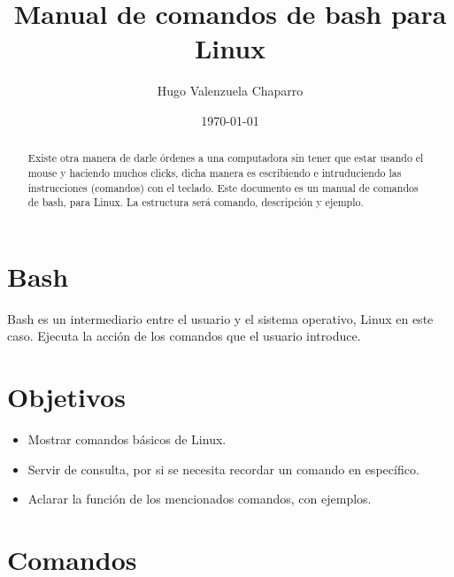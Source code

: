 \documentclass[notitlepage,12pt]{article}
\title{Manual de comandos de bash para Linux}
\author{Hugo Valenzuela Chaparro}
\date{\today}
\begin{document}
\begin{abstract}
\color{blue} Existe otra manera de darle \'ordenes a una computadora sin tener que estar usando el mouse y haciendo muchos clicks, dicha manera es escribiendo e intruduciendo las instrucciones (comandos) con el teclado. Este documento es un manual de comandos de bash, para Linux. La estructura ser\'a comando, descripci\'on y ejemplo.
\end{abstract}



\maketitle

\section{Bash}
Bash es un intermediario entre el usuario y el sistema operativo, {\color{red} Linux} en este caso. Ejecuta la acci\'on de los comandos que el usuario introduce.

\section{Objetivos}
\begin{itemize}
\item Mostrar comandos b\'asicos de Linux.
\item Servir de consulta, por si se necesita recordar un comando en espec\'ifico.
\item Aclarar la funci\'on de los mencionados comandos, con ejemplos.
\end{itemize}

\section{Comandos}
\end{document}
